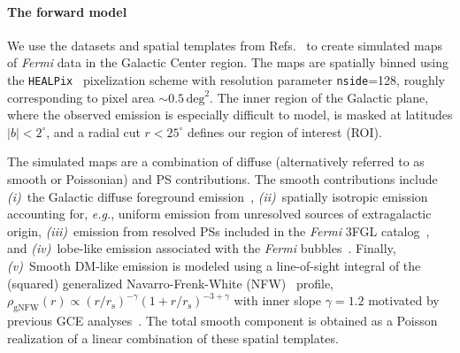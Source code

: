 \documentclass[]{article}
\newcommand{\Fermi}{\emph{Fermi}\xspace}
\begin{document}
\paragraph{The forward model} We use the datasets and spatial templates from Refs.~\cite{rodd_nicholas_safdi_siddharth_2016,Mishra-Sharma:2016gis} to create simulated maps of \Fermi data in the Galactic Center region. 
The maps are spatially binned using the \texttt{HEALPix}~\cite{Gorski:2004by} pixelization scheme with resolution parameter \texttt{nside}=128, roughly corresponding to pixel area $\sim 0.5\,\mathrm{deg}^2$. The inner region of the Galactic plane, where the observed emission is especially difficult to model, is masked at latitudes $|b| < 2^\circ$, and a radial cut $r < 25^\circ$ defines our region of interest (ROI).

The simulated maps are a combination of diffuse (alternatively referred to as smooth or Poissonian) and PS contributions. The smooth contributions include \emph{(i)}~the Galactic diffuse foreground emission~\cite{Buschmann:2020adf}, \emph{(ii)}~spatially isotropic emission accounting for, \emph{e.g.}, uniform emission from unresolved sources of extragalactic origin, \emph{(iii)}~emission from resolved PSs included in the \Fermi 3FGL catalog~\cite{Fermi-LAT:2015bhf}, and \emph{(iv)}~lobe-like emission associated with the \Fermi bubbles~\cite{Su:2010qj}. Finally, \emph{(v)}~Smooth DM-like emission is modeled using a line-of-sight integral of the (squared) generalized Navarro-Frenk-White (NFW)~\cite{Navarro:1995iw,Navarro:1996gj} profile, $\rho_\mathrm{gNFW}(r) \propto {\left(r / r_{\mathrm s}\right)^{-\gamma}\left(1+r / r_{\mathrm s}\right)^{-3+\gamma}}$ with inner slope $\gamma=1.2$ motivated by previous GCE analyses~\cite{Gordon:2013vta,Daylan:2014rsa,Zhou:2014lva}. The total smooth component is obtained as a Poisson realization of a linear combination of these spatial templates. %
\end{document}
